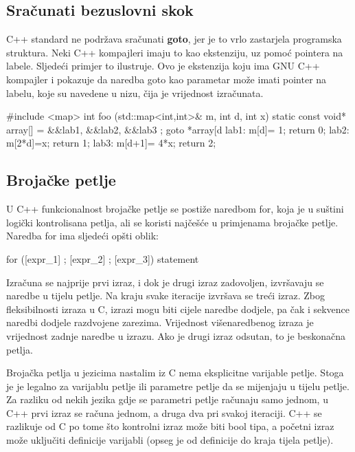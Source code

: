 \documentclass[11pt]{book}
\begin{document}
\subsection{Sračunati bezuslovni skok}

C++ standard ne podržava sračunati \textbf{goto}, jer je to vrlo zastarjela programska struktura. Neki C++ kompajleri imaju to kao ekstenziju, uz pomoć pointera na labele. Sljedeći primjer to ilustruje. Ovo je ekstenzija koju ima GNU C++ kompajler i pokazuje da naredba goto kao parametar može imati pointer na labelu, koje su navedene u nizu, čija je vrijednost izračunata.

\begin{shortlisting}
  #include <map>
  int foo (std::map<int,int>& m, int d, int x) {
  static const void* array[] = {&&lab1, &&lab2, &&lab3 };
  goto *array[d%
  lab1: { m[d]= 1;     return 0;     }
  lab2: { m[2*d]=x;    return 1;     }
  lab3: { m[d+1]= 4*x; return 2;     }
  }
\end{shortlisting}

\subsection{Brojačke petlje}

U C++ funkcionalnost brojačke petlje se postiže naredbom for, koja je u suštini logički kontrolisana petlja, ali se koristi najčešće u primjenama brojačke petlje. Naredba for ima sljedeći opšti oblik:

\begin{shortlisting}
  for ([expr_1] ; [expr_2] ; [expr_3]) statement
\end{shortlisting}

Izračuna se najprije prvi izraz, i dok je drugi izraz zadovoljen, izvršavaju se naredbe u tijelu petlje. Na kraju svake iteracije izvršava se treći izraz. Zbog fleksibilnosti izraza u C, izrazi mogu biti cijele naredbe dodjele, pa čak i sekvence naredbi dodjele razdvojene zarezima. Vrijednost višenaredbenog izraza je vrijednost zadnje naredbe u izrazu. Ako je drugi izraz odsutan, to je beskonačna petlja.

Brojačka petlja u jezicima nastalim iz C nema eksplicitne varijable petlje. Stoga je je legalno za varijablu petlje ili parametre petlje da se mijenjaju u tijelu petlje. Za razliku od nekih jezika gdje se parametri petlje računaju samo jednom, u C++ prvi izraz se računa jednom, a druga dva pri svakoj iteraciji. C++ se razlikuje od C po tome što kontrolni izraz može biti bool tipa, a početni izraz može uključiti definicije varijabli (opseg je od definicije do kraja tijela petlje).
\end{document}
